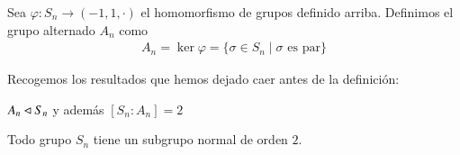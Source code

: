 \begin{dfn}
	Sea $\varphi: S_n \to ({-1, 1}, \cdot)$ el homomorfismo de grupos definido arriba. Definimos el grupo alternado $A_n$ como
	\begin{align*}
		A_n = \ker \varphi = \{\sigma \in S_n \mid \sigma \text{ es par}\}
	\end{align*}
\end{dfn}

Recogemos los resultados que hemos dejado caer antes de la definición:

\begin{pro}
	$A_n \lhd S_n$ y además $[S_n : A_n] = 2$
\end{pro}

\begin{cor}
	Todo grupo $S_n$ tiene un subgrupo normal de orden $2$.
\end{cor}